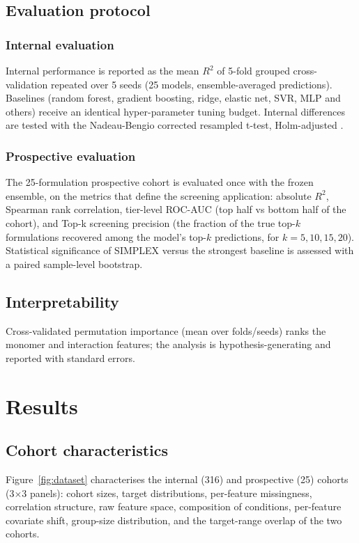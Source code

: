 \documentclass[utf8]{FrontiersinHarvard}
\begin{document}
\subsection{Evaluation protocol}

\subsubsection{Internal evaluation}
Internal performance is reported as the mean $R^2$ of 5-fold grouped cross-validation repeated over 5 seeds (25 models, ensemble-averaged predictions). Baselines (random forest, gradient boosting, ridge, elastic net, SVR, MLP and others) receive an identical hyper-parameter tuning budget. Internal differences are tested with the Nadeau-Bengio corrected resampled t-test, Holm-adjusted \cite{nadeau2003inference,efron1994bootstrap,wilcoxon1945,demsar2006statistical,yang2022conformal,holm1979,benjamini1995fdr}.

\subsubsection{Prospective evaluation}
The 25-formulation prospective cohort is evaluated once with the frozen ensemble, on the metrics that define the screening application: absolute $R^2$, Spearman rank correlation, tier-level ROC-AUC (top half vs bottom half of the cohort), and Top-k screening precision (the fraction of the true top-$k$ formulations recovered among the model's top-$k$ predictions, for $k=5,10,15,20$). Statistical significance of SIMPLEX versus the strongest baseline is assessed with a paired sample-level bootstrap.

\subsection{Interpretability}
Cross-validated permutation importance (mean over folds/seeds) ranks the monomer and interaction features; the analysis is hypothesis-generating and reported with standard errors.

\section{Results}

\subsection{Cohort characteristics}

Figure~\ref{fig:dataset} characterises the internal (316) and prospective (25) cohorts (3$\times$3 panels): cohort sizes, target distributions, per-feature missingness, correlation structure, raw feature space, composition of conditions, per-feature covariate shift, group-size distribution, and the target-range overlap of the two cohorts.
\end{document}

